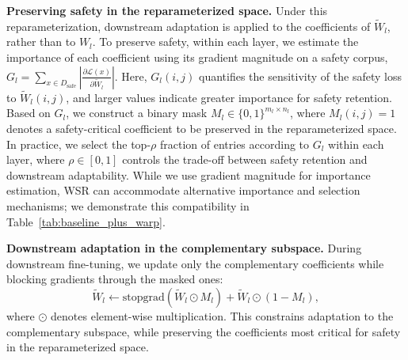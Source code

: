 \documentclass{article}
\newcommand{\kms}[1]{{\leavevmode\color{blue}[MS: #1]}}
\begin{document}
\textbf{Preserving safety in the reparameterized space.} Under this reparameterization, downstream adaptation is applied to the coefficients of $\widetilde{W}_l$, rather than to $W_l$. 
To preserve safety, within each layer, we estimate the importance of each coefficient using its gradient magnitude on a safety corpus,
$G_l = \sum_{x \in D_{\mathrm{safe}}} \left|\frac{\partial \mathcal{L}(x)}{\partial \widetilde{W}_l}\right|$.
Here, $G_l(i,j)$ quantifies the sensitivity of the safety loss to $\widetilde{W}_l(i,j)$, and larger values indicate greater importance for safety retention. Based on $G_l$, we construct a binary mask $M_l \in \{0,1\}^{m_l \times n_l}$, where $M_l(i,j)=1$ denotes a safety-critical coefficient to be preserved in the reparameterized space. %
In practice, we select the top-$\rho$ fraction of entries according to $G_l$ within each layer, where $\rho \in [0,1]$ controls the trade-off between safety retention and downstream adaptability. 
While we use gradient magnitude for importance estimation,  WSR can accommodate alternative importance and selection mechanisms; we demonstrate this compatibility in Table~\ref{tab:baseline_plus_warp}.



\textbf{Downstream adaptation in the complementary subspace.} During downstream fine-tuning, we update only the complementary coefficients while blocking gradients through the masked ones:
\begin{equation}
\widetilde{W}_l \leftarrow
\mathrm{stopgrad}(\widetilde{W}_l \odot M_l)
+
\widetilde{W}_l \odot (1 - M_l),
\end{equation}
where $\odot$ denotes element-wise multiplication. This constrains adaptation to the complementary subspace, while preserving the coefficients most critical for safety in the reparameterized space. 



\end{document}
